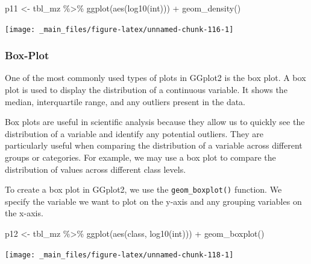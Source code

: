 \documentclass[
]{book}
\newenvironment{Shaded}{\begin{snugshade}}{\end{snugshade}}
\newcommand{\FunctionTok}[1]{\textcolor[rgb]{0.00,0.00,0.00}{#1}}
\newcommand{\NormalTok}[1]{#1}
\newcommand{\OtherTok}[1]{\textcolor[rgb]{0.56,0.35,0.01}{#1}}
\newcommand{\SpecialCharTok}[1]{\textcolor[rgb]{0.00,0.00,0.00}{#1}}
\begin{document}
\begin{Shaded}
\begin{Highlighting}[]
\NormalTok{p11 }\OtherTok{\textless{}{-}}\NormalTok{ tbl\_mz }\SpecialCharTok{\%\textgreater{}\%} 
  \FunctionTok{ggplot}\NormalTok{(}\FunctionTok{aes}\NormalTok{(}\FunctionTok{log10}\NormalTok{(int))) }\SpecialCharTok{+} 
  \FunctionTok{geom\_density}\NormalTok{()}
\end{Highlighting}
\end{Shaded}

\begin{center}\texttt{[image: \_main\_files/figure-latex/unnamed-chunk-116-1]} \end{center}

\hypertarget{box-plot}{%
\subsubsection*{Box-Plot}\label{box-plot}}

One of the most commonly used types of plots in GGplot2 is the box plot. A box plot is used to display the distribution of a continuous variable. It shows the median, interquartile range, and any outliers present in the data.

Box plots are useful in scientific analysis because they allow us to quickly see the distribution of a variable and identify any potential outliers. They are particularly useful when comparing the distribution of a variable across different groups or categories. For example, we may use a box plot to compare the distribution of values across different class levels.

To create a box plot in GGplot2, we use the \texttt{geom\_boxplot()} function. We specify the variable we want to plot on the y-axis and any grouping variables on the x-axis.

\begin{Shaded}
\begin{Highlighting}[]
\NormalTok{p12 }\OtherTok{\textless{}{-}}\NormalTok{ tbl\_mz }\SpecialCharTok{\%\textgreater{}\%} 
  \FunctionTok{ggplot}\NormalTok{(}\FunctionTok{aes}\NormalTok{(class, }\FunctionTok{log10}\NormalTok{(int))) }\SpecialCharTok{+} 
  \FunctionTok{geom\_boxplot}\NormalTok{()}
\end{Highlighting}
\end{Shaded}

\begin{center}\texttt{[image: \_main\_files/figure-latex/unnamed-chunk-118-1]} \end{center}
\end{document}
